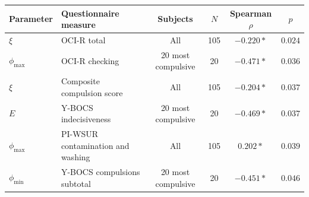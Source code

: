 \begin{tabular}{llcccc}
\toprule
Parameter & Questionnaire measure & Subjects & $N$ & Spearman $\rho$ & $p$ \\
\midrule
$\xi$ & OCI-R total & All & 105 & $-0.220*$ & $0.024$ \\
$\phi_{\max}$ & OCI-R checking & 20 most compulsive & 20 & $-0.471*$ & $0.036$ \\
$\xi$ & Composite compulsion score & All & 105 & $-0.204*$ & $0.037$ \\
$E$ & Y-BOCS indecisiveness & 20 most compulsive & 20 & $-0.469*$ & $0.037$ \\
$\phi_{\max}$ & PI-WSUR contamination and washing & All & 105 & $0.202*$ & $0.039$ \\
$\phi_{\min}$ & Y-BOCS compulsions subtotal & 20 most compulsive & 20 & $-0.451*$ & $0.046$ \\
\bottomrule
\end{tabular}
